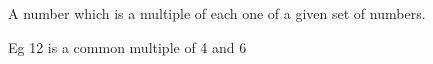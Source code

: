 A number which is a multiple of each one of a given
set of numbers.

\par
Eg 12 is a common multiple of 4 and 6